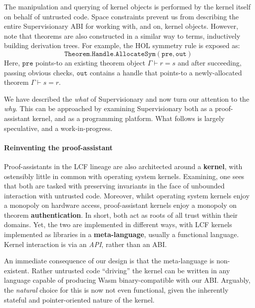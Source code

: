 \documentclass[sigplan, review]{acmart}
\newcommand{\deffont}[1]{\textbf{#1}}
\begin{document}

The manipulation and querying of kernel objects is performed by the kernel itself on behalf of untrusted code.
Space constraints prevent us from describing the entire Supervisionary ABI for working with, and on, kernel objects.
However, note that theorems are also constructed in a similar way to terms, inductively building derivation trees.
For example, the HOL symmetry rule is exposed as:
\begin{displaymath}
\mathtt{Theorem.Handle.AllocateSym(pre, out)}
\end{displaymath}
Here, $\mathtt{pre}$ points-to an existing theorem object $\Gamma \vdash r = s$ and after succeeding, passing obvious checks, $\mathtt{out}$ contains a handle that points-to a newly-allocated theorem $\Gamma \vdash s = r$.

We have described the \emph{what} of Supervisionary and now turn our attention to the \emph{why}.
This can be approached by examining Supervisionary both as a proof-assistant kernel, and as a programming platform.
What follows is largely speculative, and a work-in-progress.

\paragraph{Reinventing the proof-assistant}

Proof-assistants in the LCF lineage are also architected around a \deffont{kernel}, with ostensibly little in common with operating system kernels.
Examining, one sees that both are tasked with preserving invariants in the face of unbounded interaction with untrusted code.
Moreover, whilst operating system kernels enjoy a monopoly on hardware access, proof-assistant kernels enjoy a monopoly on theorem \deffont{authentication}.
In short, both act as roots of all trust within their domains.
Yet, the two are implemented in different ways, with LCF kernels implemented as libraries in a \deffont{meta-language}, usually a functional language.
Kernel interaction is via an \emph{API}, rather than an ABI.

An immediate consequence of our design is that the meta-language is non-existent.
Rather untrusted code ``driving'' the kernel can be written in any language capable of producing Wasm binary-compatible with our ABI.
Arguably, the \emph{natural} choice for this is now not even functional, given the inherently stateful and pointer-oriented nature of the kernel.
\end{document}
